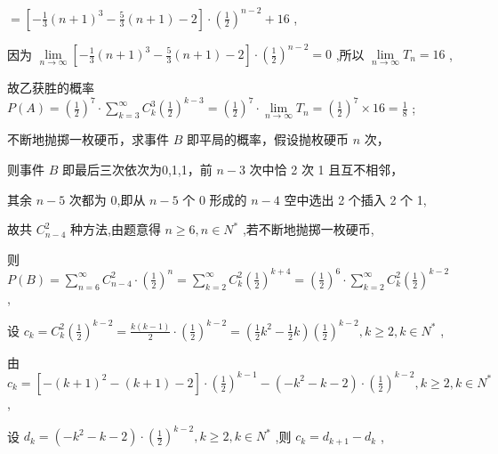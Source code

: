 \documentclass[10pt]{article}
\newcommand*\circled[1]{\tikz[baseline=(char.base)]{\node[shape=circle,draw,inner sep=1.5pt] (char) {\small #1};}}
\begin{document}
\(= \left\lbrack  {-\frac{1}{3}{\left( n + 1\right) }^{3} - \frac{5}{3}\left( {n + 1}\right)  - 2}\right\rbrack   \cdot  {\left( \frac{1}{2}\right) }^{n - 2} + {16}\) ,

因为 \(\mathop{\lim }\limits_{{n \rightarrow  \infty }}\left\lbrack  {-\frac{1}{3}{\left( n + 1\right) }^{3} - \frac{5}{3}\left( {n + 1}\right)  - 2}\right\rbrack   \cdot  {\left( \frac{1}{2}\right) }^{n - 2} = 0\) ,所以 \(\mathop{\lim }\limits_{{n \rightarrow  \infty }}{T}_{n} = {16}\) ,

故乙获胜的概率 \(P\left( A\right)  = {\left( \frac{1}{2}\right) }^{7} \cdot  \mathop{\sum }\limits_{{k = 3}}^{\infty }{C}_{k}^{3}{\left( \frac{1}{2}\right) }^{k - 3} = {\left( \frac{1}{2}\right) }^{7} \cdot  \mathop{\lim }\limits_{{n \rightarrow  \infty }}{T}_{n} = {\left( \frac{1}{2}\right) }^{7} \times  {16} = \frac{1}{8}\) ;

 \circled{2} 不断地抛掷一枚硬币，求事件 \(B\) 即平局的概率，假设抛枚硬币 \(n\) 次，

则事件 \(B\) 即最后三次依次为0,1,1，前 \(n - 3\) 次中恰 2 次 1 且互不相邻，

其余 \(n - 5\) 次都为 0,即从 \(n - 5\) 个 0 形成的 \(n - 4\) 空中选出 2 个插入 2 个 1,

故共 \({C}_{n - 4}^{2}\) 种方法,由题意得 \(n \geq  6,n \in  {N}^{ * }\) ,若不断地抛掷一枚硬币,

则 \(P\left( B\right)  = \mathop{\sum }\limits_{{n = 6}}^{\infty }{C}_{n - 4}^{2} \cdot  {\left( \frac{1}{2}\right) }^{n} = \mathop{\sum }\limits_{{k = 2}}^{\infty }{C}_{k}^{2}{\left( \frac{1}{2}\right) }^{k + 4} = {\left( \frac{1}{2}\right) }^{6} \cdot  \mathop{\sum }\limits_{{k = 2}}^{\infty }{C}_{k}^{2}{\left( \frac{1}{2}\right) }^{k - 2}\) ,

设 \({c}_{k} = {C}_{k}^{2}{\left( \frac{1}{2}\right) }^{k - 2} = \frac{k\left( {k - 1}\right) }{2} \cdot  {\left( \frac{1}{2}\right) }^{k - 2} = \left( {\frac{1}{2}{k}^{2} - \frac{1}{2}k}\right) {\left( \frac{1}{2}\right) }^{k - 2},k \geq  2,k \in  {N}^{ * }\) ,

由 \({c}_{k} = \left\lbrack  {-{\left( k + 1\right) }^{2} - \left( {k + 1}\right)  - 2}\right\rbrack   \cdot  {\left( \frac{1}{2}\right) }^{k - 1} - \left( {-{k}^{2} - k - 2}\right)  \cdot  {\left( \frac{1}{2}\right) }^{k - 2},k \geq  2,k \in  {N}^{ * }\) ,

设 \({d}_{k} = \left( {-{k}^{2} - k - 2}\right)  \cdot  {\left( \frac{1}{2}\right) }^{k - 2},k \geq  2,k \in  {N}^{ * }\) ,则 \({c}_{k} = {d}_{k + 1} - {d}_{k}\) ,
\end{document}
